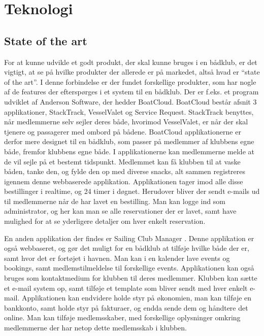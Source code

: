 \chapter{Teknologi}\label{chap:teknologi-analyse}


\section{State of the art}
For at kunne udvikle et godt produkt, der skal kunne bruges i en bådklub, er det vigtigt, at se på hvilke
produkter der allerede er på markedet, altså hvad er ``state of the art''. I denne forbindelse er der fundet
forskellige produkter, som har nogle af de features der efterspørges i et system til en bådklub. 
\newline
Der er f.eks.
et program udviklet af Anderson Software, der hedder BoatCloud.\citep{BoatCloud} BoatCloud består afsnit 3
applikationer, StackTrack, VesselValet og Service Request. StackTrack benyttes, når medlemmerne selv sejler
deres både, hvorimod VesselValet, er når der skal tjenere og passagerer med ombord på bådene. BoatCloud
applikationerne er derfor mere designet til en bådklub, som passer på medlemmer af klubbens egne både, fremfor
klubbens egne både. I applikationerne kan medlemmerne melde at de vil sejle på et bestemt tidspunkt. Medlemmet
kan få klubben til at vaske båden, tanke den, og fylde den op med diverse snacks, alt sammen registreres
igennem denne webbaserede applikation. Applikationen tager imod alle disse bestillinger i realtime, og 24
timer i døgnet. Herudover bliver der sendt e-mails ud til medlemmerne når de har lavet en bestilling. Man kan
logge ind som administrator, og her kan man se alle reservationer der er lavet, samt have mulighed for at
se yderligere detaljer om hver enkelt reservation.

En anden applikation der findes er Sailing Club Manager \citep{SailClub}. Denne applikation er også
webbaseret, og gør det muligt for en bådklub at tilføje hvilke både der er, samt hvor det er fortøjet i
havnen. Man kan i en kalender lave events og bookings, samt medlemstilmeldelse til forskellige events. Applikationen kan også bruges som kontaktmedium for klubben til deres medlemmer. Klubben kan sætte et
e-mail system op, samt tilføje et template som bliver sendt med hver enkelt e-mail. Applikationen kan endvidere
holde styr på økonomien, man kan tilføje en bankkonto, samt  holde styr på fakturaer, og endda sende
dem og håndtere det online. Man kan tilføje medlemsskaber, med forskellige oplysninger omkring medlemmerne der
har netop dette medlemsskab i klubben.

